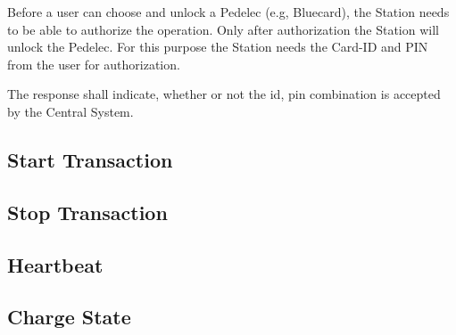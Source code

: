 Before a user can choose and unlock a Pedelec (e.g, Bluecard), the Station needs to be able to authorize the operation. Only after authorization the Station will unlock the Pedelec. For this purpose the Station needs the Card-ID and PIN from the user for authorization.

The response shall indicate, whether or not the id, pin combination is accepted by the Central System.

\subsection{Start Transaction}

\subsection{Stop Transaction}

\subsection{Heartbeat}

\subsection{Charge State}